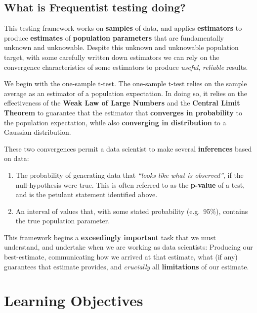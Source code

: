\documentclass[
]{book}
\providecommand{\tightlist}{%
  \setlength{\itemsep}{0pt}\setlength{\parskip}{0pt}}
\theoremstyle{definition}
\theoremstyle{definition}
\theoremstyle{definition}
\theoremstyle{definition}
\theoremstyle{remark}
\begin{document}
\hypertarget{what-is-frequentist-testing-doing}{%
\subsection*{What is Frequentist testing doing?}\label{what-is-frequentist-testing-doing}}

This testing framework works on \textbf{samples} of data, and applies \textbf{estimators} to produce \textbf{estimates} of \textbf{population parameters} that are fundamentally unknown and unknowable. Despite this unknown and unknowable population target, with some carefully written down estimators we can rely on the convergence characteristics of some estimators to produce \emph{useful}, \emph{reliable} results.

We begin with the one-sample t-test. The one-sample t-test relies on the sample average as an estimator of a population expectation. In doing so, it relies on the effectiveness of the \textbf{Weak Law of Large Numbers} and the \textbf{Central Limit Theorem} to guarantee that the estimator that \textbf{converges in probability} to the population expectation, while also \textbf{converging in distribution} to a Gaussian distribution.

These two convergences permit a data scientist to make several \textbf{inferences} based on data:

\begin{enumerate}
\def\labelenumi{\arabic{enumi}.}
\tightlist
\item
  The probability of generating data that \emph{``looks like what is observed''}, if the null-hypothesis were true. This is often referred to as the \textbf{p-value} of a test, and is the petulant statement identified above.
\item
  An interval of values that, with some stated probability (e.g.~95\%), contains the true population parameter.
\end{enumerate}

This framework begins a \textbf{exceedingly important} task that we must understand, and undertake when we are working as data scientists: Producing our best-estimate, communicating how we arrived at that estimate, what (if any) guarantees that estimate provides, and \emph{crucially} all \textbf{limitations} of our estimate.

\hypertarget{learning-objectives-5}{%
\section{Learning Objectives}\label{learning-objectives-5}}
\end{document}
